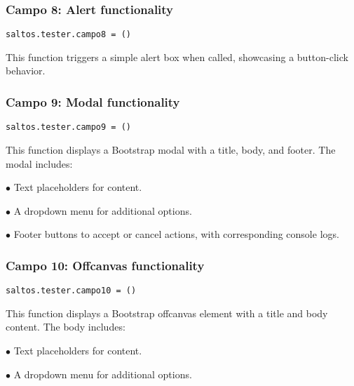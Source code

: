 \documentclass[a4paper]{article}
\begin{document}
\hypertarget{toc159}{}
\subsubsection{Campo 8: Alert functionality}

\begin{lstlisting}
saltos.tester.campo8 = ()
\end{lstlisting}

This function triggers a simple alert box when called, showcasing a button-click behavior.

\hypertarget{toc160}{}
\subsubsection{Campo 9: Modal functionality}

\begin{lstlisting}
saltos.tester.campo9 = ()
\end{lstlisting}

This function displays a Bootstrap modal with a title, body, and footer. The modal includes:

\begin{compactitem}
\item[\color{myblue}$\bullet$] Text placeholders for content.
\item[\color{myblue}$\bullet$] A dropdown menu for additional options.
\item[\color{myblue}$\bullet$] Footer buttons to accept or cancel actions, with corresponding console logs.
\end{compactitem}

\hypertarget{toc161}{}
\subsubsection{Campo 10: Offcanvas functionality}

\begin{lstlisting}
saltos.tester.campo10 = ()
\end{lstlisting}

This function displays a Bootstrap offcanvas element with a title and body content.
The body includes:

\begin{compactitem}
\item[\color{myblue}$\bullet$] Text placeholders for content.
\item[\color{myblue}$\bullet$] A dropdown menu for additional options.
\end{compactitem}
\end{document}
